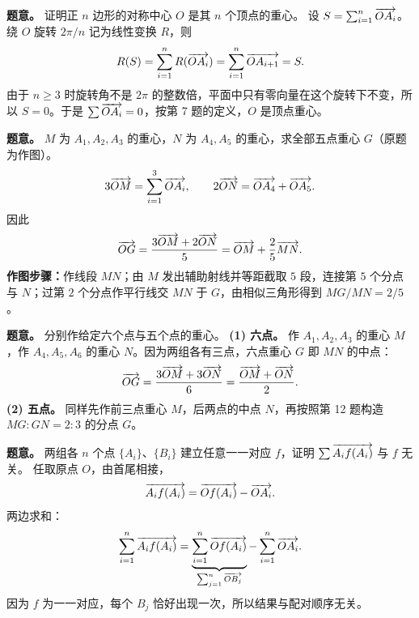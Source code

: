 \textbf{题意。} 证明正 $n$ 边形的对称中心 $O$ 是其 $n$ 个顶点的重心。
设 $S=\sum_{i=1}^n\overrightarrow{OA_i}$。绕 $O$ 旋转 $2\pi/n$ 记为线性变换 $R$，则
\[
R(S)=\sum_{i=1}^n R(\overrightarrow{OA_i})=\sum_{i=1}^n\overrightarrow{OA_{i+1}}=S.
\]
由于 $n\ge3$ 时旋转角不是 $2\pi$ 的整数倍，平面中只有零向量在这个旋转下不变，所以 $S=0$。于是 $\sum\overrightarrow{OA_i}=0$，按第 7 题的定义，$O$ 是顶点重心。

\textbf{题意。} $M$ 为 $A_1,A_2,A_3$ 的重心，$N$ 为 $A_4,A_5$ 的重心，求全部五点重心 $G$（原题为作图）。
\[
3\overrightarrow{OM}=\sum_{i=1}^3\overrightarrow{OA_i},\qquad2\overrightarrow{ON}=\overrightarrow{OA_4}+\overrightarrow{OA_5}.
\]
因此
\[
\overrightarrow{OG}=\frac{3\overrightarrow{OM}+2\overrightarrow{ON}}5
=\overrightarrow{OM}+\frac25\overrightarrow{MN}.
\]
\textbf{作图步骤：}作线段 $MN$；由 $M$ 发出辅助射线并等距截取 $5$ 段，连接第 $5$ 个分点与 $N$；过第 $2$ 个分点作平行线交 $MN$ 于 $G$，由相似三角形得到 $MG/MN=2/5$。

\textbf{题意。} 分别作给定六个点与五个点的重心。
\textbf{(1) 六点。} 作 $A_1,A_2,A_3$ 的重心 $M$，作 $A_4,A_5,A_6$ 的重心 $N$。因为两组各有三点，六点重心 $G$ 即 $MN$ 的中点：
\[
\overrightarrow{OG}=\frac{3\overrightarrow{OM}+3\overrightarrow{ON}}6=\frac{\overrightarrow{OM}+\overrightarrow{ON}}2.
\]
\textbf{(2) 五点。} 同样先作前三点重心 $M$，后两点的中点 $N$，再按照第 12 题构造 $MG:GN=2:3$ 的分点 $G$。

\textbf{题意。} 两组各 $n$ 个点 $\{A_i\}$、$\{B_i\}$ 建立任意一一对应 $f$，证明 $\sum\overrightarrow{A_i f(A_i)}$ 与 $f$ 无关。
任取原点 $O$，由首尾相接，
\[
\overrightarrow{A_i f(A_i)}=\overrightarrow{Of(A_i)}-\overrightarrow{OA_i}.
\]
两边求和：
\[
\sum_{i=1}^n\overrightarrow{A_i f(A_i)}
=\underbrace{\sum_{i=1}^n\overrightarrow{Of(A_i)}}_{\sum_{j=1}^n\overrightarrow{OB_j}}
-\sum_{i=1}^n\overrightarrow{OA_i}.
\]
因为 $f$ 为一一对应，每个 $B_j$ 恰好出现一次，所以结果与配对顺序无关。

